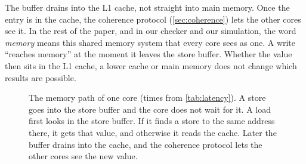 The buffer drains into the L1 cache, not straight into main memory. Once the entry is in the cache, the coherence protocol (\cref{sec:coherence}) lets the other cores see it. In the rest of the paper, and in our checker and our simulation, the word \emph{memory} means this shared memory system that every core sees as one. A write ``reaches memory'' at the moment it leaves the store buffer. Whether the value then sits in the L1 cache, a lower cache or main memory does not change which results are possible.

\begin{figure}[!htbp]
\centering
{}
\caption{The memory path of one core (times from \cref{tab:latency}). A store goes into the store buffer and the core does not wait for it. A load first looks in the store buffer. If it finds a store to the same address there, it gets that value, and otherwise it reads the cache. Later the buffer drains into the cache, and the coherence protocol lets the other cores see the new value.}
\label{fig:sbpath}
\end{figure}

